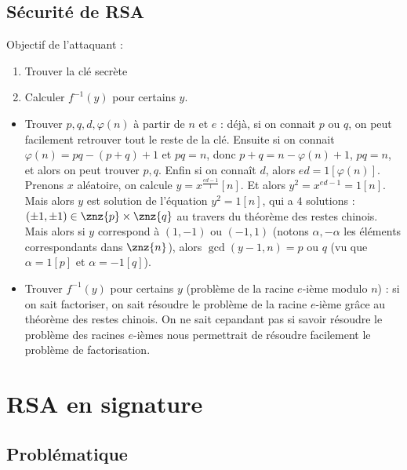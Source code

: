         \subsection{Sécurité de RSA}
            Objectif de l'attaquant :
            \begin{enumerate}
                \item Trouver la clé secrète
                \item Calculer $f^{-1}(y)$ pour certains $y$.
            \end{enumerate}
            \begin{itemize}
                \item Trouver $p, q, d, \varphi(n)$ à partir de $n$ et $e$ : déjà, si on connait $p$ ou $q$, on peut facilement retrouver tout le reste de la clé. Ensuite si on connait $\varphi(n) = pq - (p + q) + 1$ et $pq  = n$, donc $p + q = n - \varphi(n) + 1$, $pq = n$, et alors on peut trouver $p, q$. Enfin si on connaît $d$, alors $ed = 1[\varphi(n)]$. Prenons $x$ aléatoire, on calcule $y = x^{\frac{ed - 1}1} [n]$. Et alors $y^2 = x^{ed - 1} = 1[n]$. Mais alors $y$ est solution de l'équation $y^2 = 1 [n]$, qui a $4$ solutions : $(\pm 1, \pm 1) \in \znz{p} \times \znz{q}$ au travers du théorème des restes chinois. Mais alors si $y$ correspond à $(1, -1)$ ou $(-1, 1)$ (notons $\alpha, -\alpha$ les éléments correspondants dans $\znz{n}$), alors $\gcd(y - 1, n) = p$ ou $q$ (vu que $\alpha = 1[p]$ et $\alpha = -1[q]$).
                \item Trouver $f^{-1}(y)$ pour certains $y$ (problème de la racine $e$-ième modulo $n$) : si on sait factoriser, on sait résoudre le problème de la racine $e$-ième grâce au théorème des restes chinois. On ne sait cepandant pas si savoir résoudre le problème des racines $e$-ièmes nous permettrait de résoudre facilement le problème de factorisation. 
            \end{itemize}

    \section{RSA en signature}
        \subsection{Problématique}
